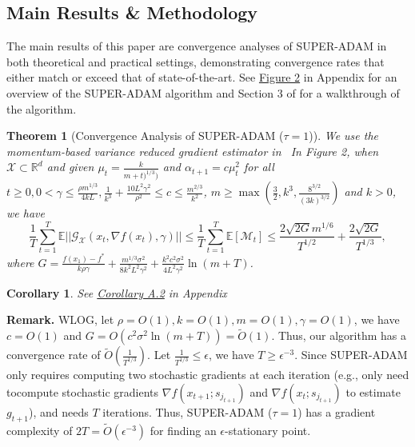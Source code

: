 \documentclass{article}
\newtheorem{theorem}{Theorem}[section]
\newtheorem{corollary}{Corollary}[section]
\begin{document}
\subsection{Main Results \& Methodology}
The main results of this paper are convergence analyses of SUPER-ADAM in both theoretical and practical settings, demonstrating convergence rates that either match or exceed that of state-of-the-art. See \hyperref[fig2]{Figure 2} in Appendix for an overview of the SUPER-ADAM algorithm and
Section 3 of \cite{https://doi.org/10.48550/arxiv.2106.08208} for a walkthrough of the algorithm.
\begin{theorem}[Convergence Analysis of SUPER-ADAM ($\tau = 1$)]
	We use the momentum-based variance reduced gradient estimator in~\cite{https://doi.org/10.48550/arxiv.1905.10018, https://doi.org/10.48550/arxiv.1905.05920}
	In Figure 2, when $\mathcal{X}\subset\mathbb{R}^d$ and given $\mu_t = \frac{k}{m+t)^{1/3})}$ and $\alpha_{t+1}=c\mu^2_t$ for all $t\geq 0, 0 < \gamma \leq \frac{\rho m^{1/3}}{4kL}, \frac{1}{k^3} + \frac{10L^2 \gamma^2}{\rho^2}\leq c\leq \frac{m^{2/3}}{k^2}$,
	$m\geq\max\left(\frac{3}{2}, k^3, \frac{8^{3/2}}{(3k)^{3/2}}\right)$ and $k > 0$, we have
	\begin{equation}
		\frac{1}{T}\sum^T_{t=1}\mathbb{E}||\mathcal{G}_{\mathcal{X}}(x_t, \nabla f(x_t), \gamma)||\leq
		\frac{1}{T}\sum^T_{t=1}\mathbb{E}[\mathcal{M}_t]\leq
		\frac{2\sqrt{2G}m^{1/6}}{T^{1/2}} + \frac{2\sqrt{2G}}{T^{1/3}},
	\end{equation}
	where $G = \frac{f(x_1) - f^*}{k\rho\gamma} + \frac{m^{1/3}\sigma^2}{8k^2 L^2 \gamma^2} + \frac{k^2 c^2 \sigma^2}{4L^2 \gamma^2}\ln(m+T)$.
\end{theorem}
\begin{corollary}
		See \hyperref[coro51appendix]{Corollary A.2} in Appendix
\end{corollary}
\textbf{Remark.} WLOG, let $\rho = O(1), k = O(1), m = O(1), \gamma = O(1)$, we have $c=O(1)$ and $G = O(c^2 \sigma^2 \ln(m+T)) = \tilde{O}(1)$. Thus, our algorithm has a convergence rate of $\tilde{O}\left(\frac{1}{T^{1/3}}\right)$.
Let $\frac{1}{T^{1/3}}\leq \epsilon$, we have $T\geq \epsilon^{-3}$. Since SUPER-ADAM only requires computing two stochastic gradients at each iteration (e.g., only need tocompute stochastic gradients $\nabla f(x_{t+1}; s_{j_{t+1}})$
and $\nabla f(x_t; s_{j_{t+1}})$ to estimate $g_{t+1}$), and needs $T$ iterations. Thus, SUPER-ADAM ($\tau = 1$) has a gradient complexity of $2T = \tilde{O}(\epsilon^{-3})$ for finding an $\epsilon$-stationary point.
\end{document}
